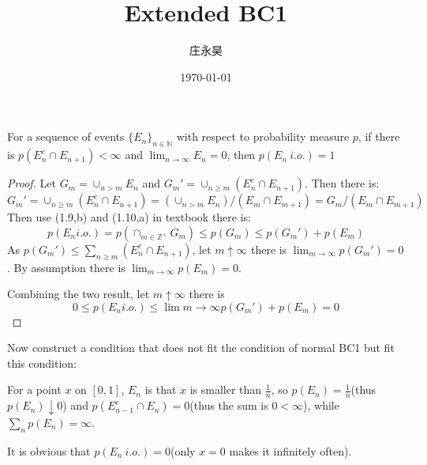 \documentclass[UTF8, a4paper, linespread=1.5]{article}
\title{Extended BC1}
\date{\today}
\author{庄永昊}
\begin{document}
\maketitle
\begin{thm}{}{}
    For a sequence of events $\{E_n\}_{n\in\mathbb N}$ with respect to probability measure $p$, 
    if there is $p(E_n^c\cap E_{n+1})<\infty$ and $\lim_{n\to \infty}E_n=0$, then $p(E_n\ i.o.)=1$
\end{thm}
\begin{proof}[Proof]
    Let $G_m=\cup_{n>m} E_n$ and $G_m'=\cup_{n\geq m} (E_n^c\cap E_{n+1})$. Then there is: 
    $$G_m'=\cup_{n\geq m} (E_n^c\cap E_{n+1})=(\cup_{n>m} E_n)/(E_m\cap E_{m+1})=G_m/(E_m\cap E_{m+1})$$
    Then use (1.9,b) and (1.10,a) in textbook there is: 
    $$p(E_n i.o.)=p(\cap_{m\in\mathbb Z^+}G_m)\leq p(G_m)\leq p(G_m')+p(E_m)$$
    As $p(G_m')\leq\sum_{n\geq m}(E_n^c\cap E_{n+1})$, let $m\uparrow\infty$ there is $\lim_{m\to\infty}p(G_m')=0$. 
    By assumption there is $\lim_{m\to\infty}p(E_m)=0$. 

    Combining the two result, let $m\uparrow\infty$ there is 
    $$0\leq p(E_n i.o.)\leq \lim{m\to\infty}p(G_m')+p(E_m)=0$$
\end{proof}

    Now construct a condition that does not fit the condition of normal BC1 but fit this condition: 

    For a point $x$ on $[0,1]$, 
    $E_n$ is that $x$ is smaller than $\frac{1}{n}$, so $p(E_n)=\frac{1}{n}$(thus $p(E_n)\downarrow 0$) and 
    $p(E_{n-1}^c\cap E_n)=0$(thus the sum is $0<\infty$), while $\sum_{n}p(E_n)=\infty$. 

    It is obvious that $p(E_n\ i.o.)=0$(only $x=0$ makes it infinitely often). 
\end{document}
